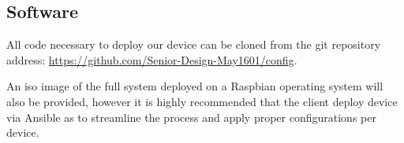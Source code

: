 \subsection{Software}
All code necessary to deploy our device can be cloned from the git repository address: \url{https://github.com/Senior-Design-May1601/config}.

An iso image of the full system deployed on a Raspbian operating system will also be provided, however it is highly recommended that the client deploy device via Ansible as to streamline the process and apply proper configurations per device.
